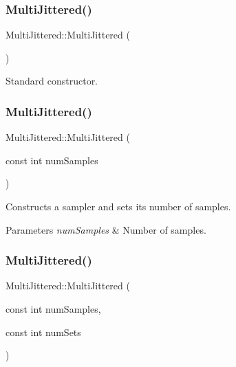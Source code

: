 \subsubsection{\texorpdfstring{Multi\+Jittered()}{MultiJittered()}\hspace{0.1cm}{\footnotesize\ttfamily [1/3]}}
{\footnotesize\ttfamily Multi\+Jittered\+::\+Multi\+Jittered (\begin{DoxyParamCaption}{ }\end{DoxyParamCaption})}

Standard constructor. \hypertarget{class_multi_jittered_a6788f23e84fc6ae4029c7fd408c8e671}{}\label{class_multi_jittered_a6788f23e84fc6ae4029c7fd408c8e671} 
\subsubsection{\texorpdfstring{Multi\+Jittered()}{MultiJittered()}\hspace{0.1cm}{\footnotesize\ttfamily [2/3]}}
{\footnotesize\ttfamily Multi\+Jittered\+::\+Multi\+Jittered (\begin{DoxyParamCaption}\item[{const int}]{num\+Samples }\end{DoxyParamCaption})}

Constructs a sampler and sets its number of samples. 
\begin{DoxyParams}{Parameters}
{\em num\+Samples} & Number of samples. \\
\hline
\end{DoxyParams}
\hypertarget{class_multi_jittered_a8b59445dea3b73a787082f8d2f5fb8b9}{}\label{class_multi_jittered_a8b59445dea3b73a787082f8d2f5fb8b9} 
\subsubsection{\texorpdfstring{Multi\+Jittered()}{MultiJittered()}\hspace{0.1cm}{\footnotesize\ttfamily [3/3]}}
{\footnotesize\ttfamily Multi\+Jittered\+::\+Multi\+Jittered (\begin{DoxyParamCaption}\item[{const int}]{num\+Samples,  }\item[{const int}]{num\+Sets }\end{DoxyParamCaption})}

